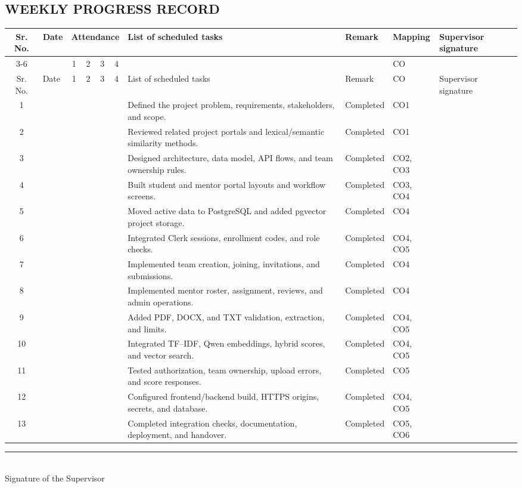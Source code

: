 \documentclass[12pt,a4paper]{article}
\newcommand{\progressrow}[4]{#1 & & & & & & #2 & #3 & #4 & \\[0.8em]\hline}
\begin{document}
\begin{landscape}
\section*{WEEKLY PROGRESS RECORD}
\small
\renewcommand{\arraystretch}{1.45}
\setlength{\tabcolsep}{3pt}
\begin{longtable}{|c|p{1.6cm}|c|c|c|c|p{6.6cm}|p{3.4cm}|p{1.3cm}|p{2.9cm}|}
\hline
\multirow{2}{*}{Sr. No.} & \multirow{2}{*}{Date} & \multicolumn{4}{c|}{Attendance} & \multirow{2}{*}{List of scheduled tasks} & \multirow{2}{*}{Remark} & Mapping & \multirow{2}{*}{Supervisor signature}\\\cline{3-6}\cline{9-9}
 & & 1 & 2 & 3 & 4 & & & CO &\\\hline
\endfirsthead
\hline
Sr. No. & Date & 1 & 2 & 3 & 4 & List of scheduled tasks & Remark & CO & Supervisor signature\\\hline
\endhead
\progressrow{1}{Defined the project problem, requirements, stakeholders, and scope.}{Completed}{CO1}
\progressrow{2}{Reviewed related project portals and lexical/semantic similarity methods.}{Completed}{CO1}
\progressrow{3}{Designed architecture, data model, API flows, and team ownership rules.}{Completed}{CO2, CO3}
\progressrow{4}{Built student and mentor portal layouts and workflow screens.}{Completed}{CO3, CO4}
\progressrow{5}{Moved active data to PostgreSQL and added pgvector project storage.}{Completed}{CO4}
\progressrow{6}{Integrated Clerk sessions, enrollment codes, and role checks.}{Completed}{CO4, CO5}
\progressrow{7}{Implemented team creation, joining, invitations, and submissions.}{Completed}{CO4}
\progressrow{8}{Implemented mentor roster, assignment, reviews, and admin operations.}{Completed}{CO4}
\progressrow{9}{Added PDF, DOCX, and TXT validation, extraction, and limits.}{Completed}{CO4, CO5}
\progressrow{10}{Integrated TF--IDF, Qwen embeddings, hybrid scores, and vector search.}{Completed}{CO4, CO5}
\progressrow{11}{Tested authorization, team ownership, upload errors, and score responses.}{Completed}{CO5}
\progressrow{12}{Configured frontend/backend build, HTTPS origins, secrets, and database.}{Completed}{CO4, CO5}
\progressrow{13}{Completed integration checks, documentation, deployment, and handover.}{Completed}{CO5, CO6}
\end{longtable}
\normalsize
\vspace{0.4cm}
\hfill \rule{6cm}{0.4pt}\\
\hfill Signature of the Supervisor
\end{landscape}
\end{document}
